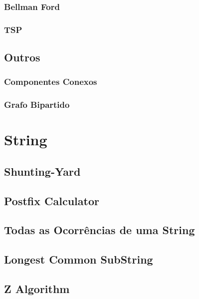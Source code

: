         \subsection{Bellman Ford}
            
            \newpage
        \subsection{TSP}
            
            \newpage
    \section{Outros}
        \subsection{Componentes Conexos}
            
            \newpage
        \subsection{Grafo Bipartido}
            
            \newpage
\newpage

\chapter{String}
    \section{Shunting-Yard}
        
    \newpage
    \section{Postfix Calculator}
        
    \newpage
    \section{Todas as Ocorrências de uma String}
        
    \section{Longest Common SubString}
        
        \newpage
    \section{Z Algorithm}
        
\newpage

